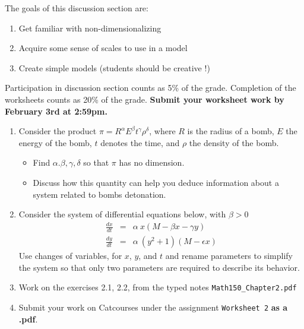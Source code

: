 \documentclass[11pt]{article}
\begin{document}
The goals of this discussion section are: 

\begin{enumerate}
\item Get familiar with non-dimensionalizing
\item Acquire some sense of scales to use in a model
\item Create simple models (students should be creative !)
\end{enumerate}

Participation in discussion section counts as 5\% of the grade. Completion of the worksheets counts as 20\% of the grade. \textbf{Submit your worksheet work by February 3rd at 2:59pm.}
\begin{enumerate}
\item Consider the product $\pi  = R^\alpha E^\beta t^\gamma \rho^\delta$, where $R$ is the radius of a bomb, $E$ the energy of the bomb, $t$ denotes the time, and $\rho$ the density of the bomb. 
\begin{itemize}
\item Find $\alpha. \beta, \gamma , \delta$ so that $\pi$ has no dimension.
\item Discuss how this quantity can help you deduce information about a system related to bombs detonation.
\end{itemize}

\item Consider the system of differential equations below, with $\beta > 0$
\begin{eqnarray*}
\frac{dx}{dt} &=& \alpha \ x (M - \beta x -  \gamma y) \\
\frac{dy}{dt} &=& \alpha \ (y^2+1) (M - \epsilon x)
\end{eqnarray*}
Use changes of variables, for $x$, $y$, and $t$ and rename parameters to simplify the system so that only two parameters are required to describe its behavior. 
\item Work on the exercises 2.1, 2.2, from the typed notes \texttt{Math150\_Chapter2.pdf}
\item Submit your work on Catcourses under the assignment \texttt{Worksheet 2} \textbf{as a .pdf}.
\end{enumerate}
\end{document}
